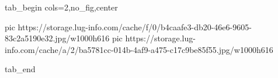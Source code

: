  
 
 
 
 


\ifcmt
  tab_begin cols=2,no_fig,center

     pic https://storage.lug-info.com/cache/f/0/b4caafe3-db20-46e6-9605-83c2a5190e32.jpg/w1000h616%
     pic https://storage.lug-info.com/cache/a/2/ba5781cc-014b-4af9-a475-c17c9be85f55.jpg/w1000h616%

  tab_end
\fi

